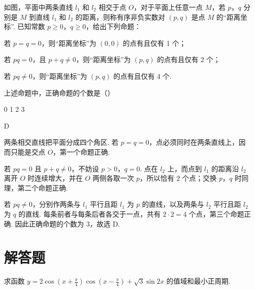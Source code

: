 \begin{problem}
如图，平面中两条直线 \(l_{1}\) 和 \(l_{2}\) 相交于点 \(O\)，对于平面上任意一点 \(M\)，若 \(p\)，\(q\) 分别是 \(M\) 到直线 \(l_{1}\) 和 \(l_{2}\) 的距离，则称有序非负实数对 \((p, q)\) 是点 \(M\) 的“距离坐标”. 已知常数 \(p \geqslant 0\)，\(q \geqslant 0\)，给出下列命题：

\begin{circlelist}
\item 若 \(p = q = 0\)，则“距离坐标”为 \((0, 0)\) 的点有且仅有 1 个；
\item 若 \(pq = 0\)，且 \(p + q \neq 0\)，则“距离坐标”为 \((p, q)\) 的点有且仅有 2 个；
\item 若 \(pq \neq 0\)，则“距离坐标”为 \((p, q)\) 的点有且仅有 4 个.
\end{circlelist}

上述命题中，正确命题的个数是（\quad）


\choices
    {0}
    {1}
    {2}
    {3}
\end{problem}

\begin{answer}
D
\end{answer}

\begin{solution}
两条相交直线把平面分成四个角区. 若 \(p=q=0\)，点必须同时在两条直线上，因而只能是交点 \(O\)，第一个命题正确.

若 \(pq=0\) 且 \(p+q\neq0\)，不妨设 \(p>0\)，\(q=0\). 点在 \(l_2\) 上，而点到 \(l_1\) 的距离沿 \(l_2\) 离开 \(O\) 时连续增大，并在 \(O\) 两侧各取一次 \(p\)，所以恰有 \(2\) 个点；交换 \(p\)，\(q\) 时同理，第二个命题正确.

若 \(pq\neq0\)，分别作两条与 \(l_1\) 平行且距 \(l_1\) 为 \(p\) 的直线，以及两条与 \(l_2\) 平行且距 \(l_2\) 为 \(q\) 的直线. 每条前者与每条后者各交于一点，共有 \(2\cdot2=4\) 个点，第三个命题正确. 因此正确命题的个数为 \(3\)，故选 D.
\end{solution}

\section{解答题}
\begin{problem}
求函数 \( y = 2\cos \left( x + \frac{\pi}{4} \right) \cos \left( x - \frac{\pi}{4} \right) + \sqrt{3} \sin 2x \) 的值域和最小正周期.
\end{problem}

